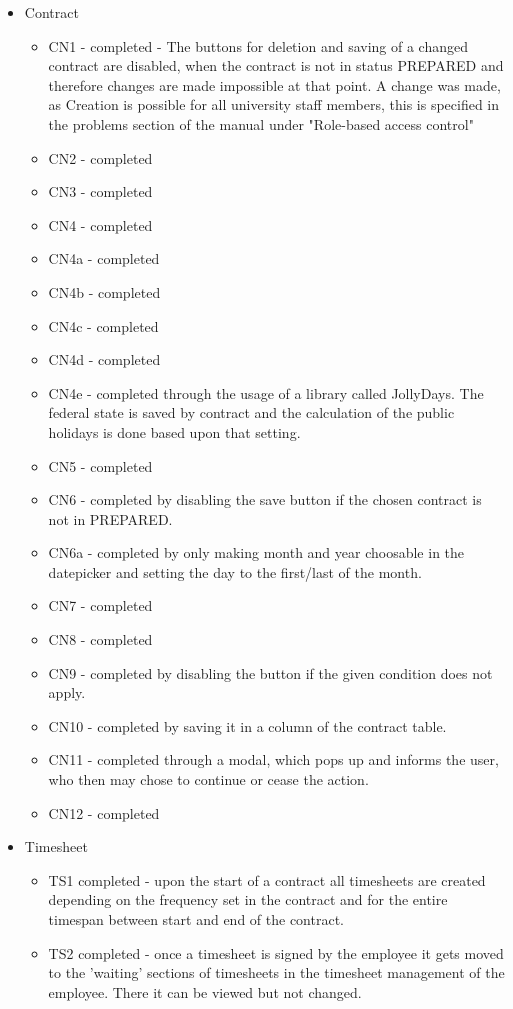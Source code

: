 \documentclass{article}
\begin{document}
\begin{itemize}
\item Contract
\begin{itemize}
\item CN1 - completed - The buttons for deletion and saving of a changed contract are disabled, when the contract is not in status PREPARED and therefore changes are made impossible at that point. A change was made, as Creation is possible for all university staff members, this is specified in the problems section of the manual under "Role-based access control"
\item CN2 - completed
\item CN3 - completed
\item CN4 - completed
\item CN4a - completed
\item CN4b - completed
\item CN4c - completed
\item CN4d - completed
\item CN4e - completed through the usage of a library called JollyDays. The federal state is saved by contract and the calculation of the public holidays is done based upon that setting.
\item CN5 - completed 
\item CN6 - completed by disabling the save button if the chosen contract is not in PREPARED.
\item CN6a - completed by only making month and year choosable in the datepicker and setting the day to the first/last of the month.
\item CN7 - completed
\item CN8 - completed
\item CN9 - completed by disabling the button if the given condition does not apply.
\item CN10 - completed by saving it in a column of the contract table.
\item CN11 - completed through a modal, which pops up and informs the user, who then may chose to continue or cease the action.
\item CN12 - completed
\end{itemize}
\item Timesheet
\begin{itemize}
\item TS1 completed - upon the start of a contract all timesheets are created depending on the frequency set in the contract and for the entire timespan between start and end of the contract.
\item TS2 completed - once a timesheet is signed by the employee it gets moved to the 'waiting' sections of timesheets in the timesheet management of the employee. There it can be viewed but not changed.

\end{itemize}
\end{itemize}
\end{document}
